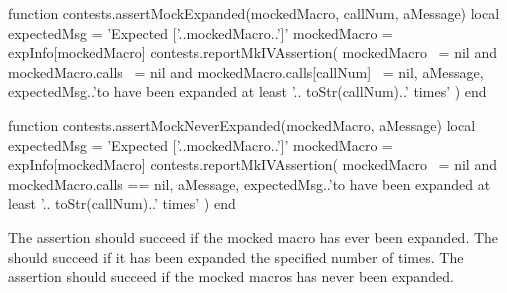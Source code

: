 \startLuaCode
function contests.assertMockExpanded(mockedMacro, callNum, aMessage)
  local expectedMsg = 'Expected ['..mockedMacro..']'
  mockedMacro = expInfo[mockedMacro]
  contests.reportMkIVAssertion(
    mockedMacro ~= nil
    and mockedMacro.calls ~= nil
    and mockedMacro.calls[callNum] ~= nil,
    aMessage,
    expectedMsg..'to have been expanded at least '..
      toStr(callNum)..' times'
  )
end

function contests.assertMockNeverExpanded(mockedMacro, aMessage)
  local expectedMsg = 'Expected ['..mockedMacro..']'
  mockedMacro = expInfo[mockedMacro]
  contests.reportMkIVAssertion(
    mockedMacro ~= nil
    and mockedMacro.calls == nil,
    aMessage,
    expectedMsg..'to have been expanded at least '..
      toStr(callNum)..' times'
  )
end
\stopLuaCode


The \type{\assertMockExpanded} assertion should succeed if the mocked 
macro has ever been expanded. The \type{\assertMockExpandedNTimes} should 
succeed if it has been expanded the specified number of times. The 
\type{\assertMockNeverExpanded} assertion should succeed if the mocked 
macros has never been expanded. 

\startConTest
\begingroup
  \aTexMockZeroArgs
  \startAssertShouldFail{}{}{}
  \stopAssertShouldFail
\endgroup
\stopConTest

\skipTestCase

\startConTest
\begingroup
  \startAssertShouldFail{}{}{}
  \stopAssertShouldFail
  \aContextMock
  \startAssertShouldFail{}{}{}
  \stopAssertShouldFail
  \startAssertShouldFail{}{}{}
  \stopAssertShouldFail
\endgroup
\stopConTest
\skipTestCase
\stopTestSuite

\startTestSuite[assertMockNthArgumentOnMthExpansionMatches]

\startMkIVCode
\def\assertMockNthArgumentOnMthExpansionMatches#1#2#3#4#5{%
  \directlua{%
    thirddata.contests.assertMockArguments(
      '#1', #3, #2, '#4', '#5'
    )
  }
}
\stopMkIVCode


